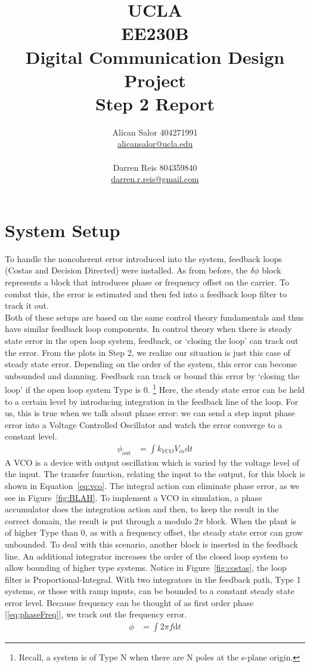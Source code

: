 \documentclass[]{article}
\title{UCLA\\EE230B\\Digital Communication Design Project\\Step 2 Report}
\author{Alican Salor 404271991 \\  \href{mailto:alicansalor@ucla.edu}{alicansalor@ucla.edu} \\ \\
Darren Reis 804359840 \\
\href{mailto:darrer.r.reis@gmail.com}{darren.r.reis@gmail.com} }
\begin{document}
\maketitle

\newpage
\tableofcontents

\newpage


\section{System Setup}
\label{sec:setup}
To handle the noncoherent error introduced into the system, feedback loops (Costas and Decision Directed) were installed.  As from before, the $\delta\phi$ block represents a block that introduces phase or frequency offset on the carrier.  To combat this, the error is estimated and then fed into a feedback loop filter to track it out. \\

Both of these setups are based on the same control theory fundamentals and thus have similar feedback loop components. In control theory when there is steady state error in the open loop system, feedback, or `closing the loop' can track out the error.  From the plots in Step 2, we realize our situation is just this case of steady state error.  Depending on the order of the system, this error can become unbounded and damning.  Feedback can track or bound this error by `closing the loop' if the open loop system Type is 0.  \footnote{Recall, a system is of Type N when there are N poles at the s-plane origin.}  Here, the steady state error can be held to a certain level by introducing integration in the feedback line of the loop.  For us, this is true when we talk about phase error: we can send a step input phase error into a Voltage Controlled Oscillator and watch the error converge to a constant level. 
\begin{align}
\label{eq:vco}
\phi_{\text{out}} &= \int \! k_{VCO}V_{in} \mathrm{d}t
\end{align}
A VCO is a device with output oscillation which is varied by the voltage level of the input.  The transfer function, relating the input to the output, for this block is shown in Equation~\ref{eq:vco}. The integral action can eliminate phase error, as we see in Figure~\ref{fig:BLAH}.  To implement a VCO in simulation, a phase accumulator does the integration   action and then, to keep the result in the correct domain, the result is put through a modulo $2\pi$ block.   
When the plant is of higher Type than 0, as with a frequency offset, the steady state error can grow unbounded.  To deal with this scenario, another block is inserted in the feedback line.  An additional integrator increases the order of the closed loop system to allow bounding of higher type systems.  Notice in Figure~\ref{fig:costas}, the loop filter is Proportional-Integral.  With two integrators in the feedback path, Type 1 systems, or those with ramp inputs, can be bounded to a constant steady state error level.  Because frequency can be thought of as first order phase [\ref{eq:phaseFreq}], we track out the frequency error.\\
\begin{align}
\label{eq:phaseFreq}
\phi &= \int \! 2\pi f \mathrm{d}t 
\end{align}
\end{document}
